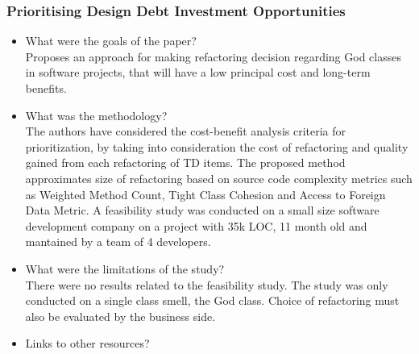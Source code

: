 \documentclass{mprop}
\begin{document}
\subsubsection{Prioritising Design Debt Investment Opportunities}
\cite{Zazworka2011Prioritise}
\begin{itemize}
	\item What were the goals of the paper? \\
	      Proposes an approach for making refactoring decision regarding God
	      classes in software projects, that will have a low principal cost
	      and long-term benefits.
	\item What was the methodology? \\
	      The authors have considered the cost-benefit analysis criteria for
	      prioritization, by taking into consideration the cost of refactoring
	      and quality gained from each refactoring of TD items. The proposed
	      method approximates size of refactoring based on source code
	      complexity metrics such as Weighted Method Count, Tight Class
	      Cohesion and Access to Foreign Data Metric. A feasibility study was
	      conducted on a small size software development company on a project
	      with 35k LOC, 11 month old and mantained by a team of 4 developers.
	\item What were the limitations of the study? \\
	      There were no results related to the feasibility study. The study
	      was only conducted on a single class smell, the God class. Choice of
	      refactoring must also be evaluated by the business side.
	\item Links to other resources? \\
\end{itemize}
\end{document}
